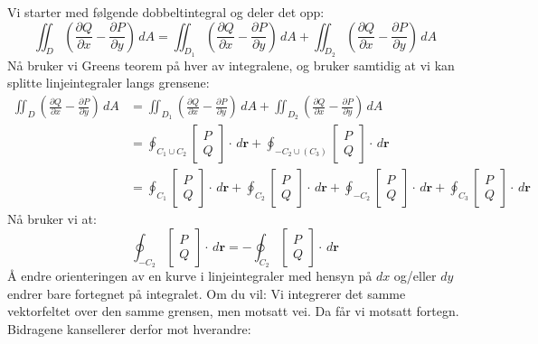 Vi starter med følgende dobbeltintegral og deler det opp:
\[
\iint_D \left( \frac{\partial Q}{\partial x} - \frac{\partial P}{\partial y} \right)\, dA
= \iint_{D_1} \left( \frac{\partial Q}{\partial x} - \frac{\partial P}{\partial y} \right)\, dA
+ \iint_{D_2} \left( \frac{\partial Q}{\partial x} - \frac{\partial P}{\partial y} \right)\, dA
\]
Nå bruker vi Greens teorem på hver av integralene, og bruker samtidig at vi kan splitte linjeintegraler langs grensene:
\begin{align*}
\iint_D \left( \frac{\partial Q}{\partial x} - \frac{\partial P}{\partial y} \right)\, dA
&= \iint_{D_1} \left( \frac{\partial Q}{\partial x} - \frac{\partial P}{\partial y} \right)\, dA
+ \iint_{D_2} \left( \frac{\partial Q}{\partial x} - \frac{\partial P}{\partial y} \right)\, dA \\
&= \oint_{C_1 \cup C_2}\begin{bmatrix} P\\ Q\end{bmatrix} \cdot \, d\mathbf{r}
+ \oint_{-C_2 \cup (C_3)} \begin{bmatrix} P\\ Q\end{bmatrix} \cdot \, d\mathbf{r} \\
&= \oint_{C_1} \begin{bmatrix} P\\ Q\end{bmatrix} \cdot \, d\mathbf{r}
+ \oint_{C_2} \begin{bmatrix} P\\ Q\end{bmatrix} \cdot \, d\mathbf{r}
+ \oint_{-C_2}\begin{bmatrix} P\\ Q\end{bmatrix} \cdot \, d\mathbf{r}
+ \oint_{C_3} \begin{bmatrix} P\\ Q\end{bmatrix} \cdot \, d\mathbf{r}
\end{align*}
Nå bruker vi at:
\[
\oint_{-C_2} \begin{bmatrix} P\\ Q\end{bmatrix} \cdot \, d\mathbf{r} = -\oint_{C_2} \begin{bmatrix} P\\ Q\end{bmatrix} \cdot \, d\mathbf{r}
\]
Å endre orienteringen av en kurve i linjeintegraler med hensyn på \( dx \) og/eller \( dy \) endrer bare fortegnet på integralet. Om du vil: Vi integrerer det samme vektorfeltet over den samme grensen, men motsatt vei. Da får vi motsatt fortegn. Bidragene kansellerer derfor mot hverandre:
